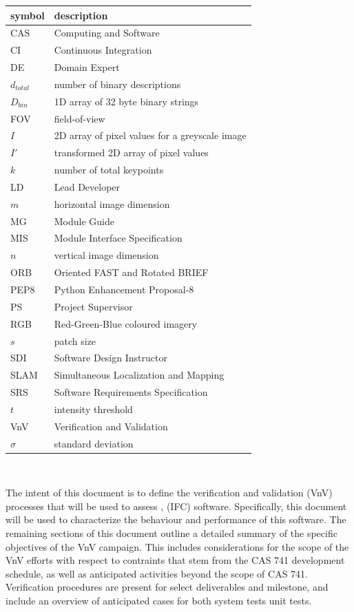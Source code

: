 \documentclass[12pt, titlepage]{article}
\begin{document}
\renewcommand{\arraystretch}{1.2}
\begin{tabular}{l l} 
  \toprule		
  \textbf{symbol} & \textbf{description}\\
  \midrule
  CAS & Computing and Software\\
  CI & Continuous Integration\\
  DE & Domain Expert \\
  $d_{total}$ & number of binary descriptions \\
  $D_{bin}$ & 1D array of 32 byte binary strings \\
  FOV & field-of-view\\
  $I$ & 2D array of pixel values for a greyscale image \\
  $I'$ & transformed 2D array of pixel values\\
  $k$ & number of total keypoints\\
  LD & Lead Developer \\
  $m$ & horizontal image dimension\\
  MG & Module Guide \\
  MIS & Module Interface Specification\\
  $n$ & vertical image dimension\\
  ORB & Oriented FAST and Rotated BRIEF\\
  PEP8 & Python Enhancement Proposal-8\\
  PS & Project Supervisor\\
  RGB & Red-Green-Blue coloured imagery\\
  $s$ & patch size\\
  SDI & Software Design Instructor\\
  SLAM & Simultaneous Localization and Mapping\\
  SRS & Software Requirements Specification\\
  $t$ & intensity threshold \\
  VnV & Verification and Validation\\
  $\sigma$ & standard deviation\\
  \bottomrule
\end{tabular}\\

\newpage

\noindent The intent of this document is to define the verification and validation (VnV) processes
that will be used to assess \progname, (IFC) software. Specifically, this document will be used to 
characterize the behaviour and performance of this software. The remaining sections of this document 
outline a detailed summary of the specific objectives of the VnV campaign. This includes considerations 
for the scope of the VnV efforts with respect to contraints that stem from the CAS 741 
development schedule, as well as anticipated activities beyond the scope of CAS 741.
Verification procedures are present for select deliverables and milestone, and include 
an overview of anticipated cases for both system tests unit tests.
\end{document}
